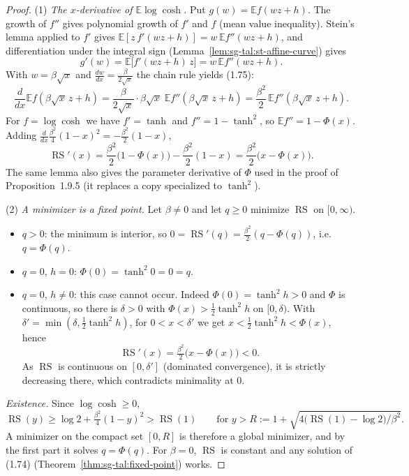 \begin{proof}
  \leanok
(1) \emph{The $x$-derivative of $\mathbb E\log\cosh$.} Put $g(w)=\mathbb E f(wz+h)$. The growth of $f''$ gives polynomial growth of $f'$ and $f$ (mean value inequality). Stein's lemma applied to $f'$ gives $\mathbb E[z\,f'(wz+h)]=w\,\mathbb E f''(wz+h)$, and differentiation under the integral sign (Lemma~\ref{lem:sg-tal:st-affine-curve}) gives
\[
g'(w)=\mathbb E\big[f'(wz+h)\,z\big]=w\,\mathbb E f''(wz+h).
\]
With $w=\beta\sqrt x$ and $\frac{dw}{dx}=\frac{\beta}{2\sqrt x}$ the chain rule yields (1.75):
\[
\frac{d}{dx}\mathbb E f(\beta\sqrt x\,z+h)=\frac{\beta}{2\sqrt x}\cdot\beta\sqrt x\;\mathbb E f''(\beta\sqrt x\,z+h)=\frac{\beta^2}{2}\,\mathbb E f''(\beta\sqrt x\,z+h).
\]
For $f=\log\cosh$ we have $f'=\tanh$ and $f''=1-\tanh^2$, so $\mathbb E f''=1-\Phi(x)$. Adding $\frac{d}{dx}\frac{\beta^2}{4}(1-x)^2=-\frac{\beta^2}{2}(1-x)$,
\[
\operatorname{RS}'(x)=\frac{\beta^2}{2}\big(1-\Phi(x)\big)-\frac{\beta^2}{2}(1-x)=\frac{\beta^2}{2}\big(x-\Phi(x)\big).
\]
The same lemma also gives the parameter derivative of $\Phi$ used in the proof of Proposition~1.9.5 (it replaces a copy specialized to $\tanh^2$).

(2) \emph{A minimizer is a fixed point.} Let $\beta\ne0$ and let $q\ge0$ minimize $\operatorname{RS}$ on $[0,\infty)$.
\begin{itemize}
\item $q>0$: the minimum is interior, so $0=\operatorname{RS}'(q)=\frac{\beta^2}{2}(q-\Phi(q))$, i.e.\ $q=\Phi(q)$.
\item $q=0$, $h=0$: $\Phi(0)=\tanh^2 0=0=q$.
\item $q=0$, $h\ne0$: this case cannot occur. Indeed $\Phi(0)=\tanh^2h>0$ and $\Phi$ is continuous, so there is $\delta>0$ with $\Phi(x)>\frac12\tanh^2h$ on $[0,\delta)$. With $\delta'=\min(\delta,\frac12\tanh^2h)$, for $0<x<\delta'$ we get $x<\frac12\tanh^2h<\Phi(x)$, hence
\[
\operatorname{RS}'(x)=\tfrac{\beta^2}{2}\big(x-\Phi(x)\big)<0 .
\]
As $\operatorname{RS}$ is continuous on $[0,\delta']$ (dominated convergence), it is strictly decreasing there, which contradicts minimality at $0$.
\end{itemize}
\emph{Existence.} Since $\log\cosh\ge0$,
\[
\operatorname{RS}(y)\ge\log2+\tfrac{\beta^2}{4}(1-y)^2>\operatorname{RS}(1)\qquad\text{for } y>R:=1+\sqrt{4\big(\operatorname{RS}(1)-\log2\big)/\beta^2}.
\]
A minimizer on the compact set $[0,R]$ is therefore a global minimizer, and by the first part it solves $q=\Phi(q)$. For $\beta=0$, $\operatorname{RS}$ is constant and any solution of (1.74) (Theorem~\ref{thm:sg-tal:fixed-point}) works.


\end{proof}

